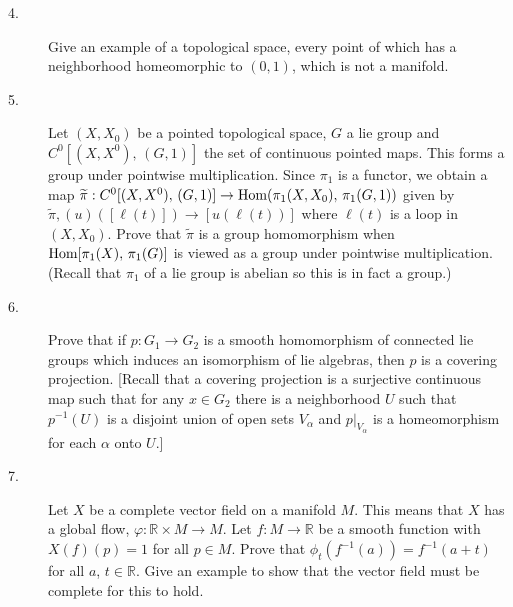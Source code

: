 \documentclass[12pt]{article}
\def\R{{\mathbb R}}
\begin{document}
\begin{large}
\begin{description}
\vspace{.15in}
\item[4.]
Give an example of a topological space, every point of which has a
neighborhood homeomorphic to $(0,1)$, which is not a manifold.

\vspace{.15in}
\item[5.]
Let $(X,X_0)$ be a pointed topological space, $G$ a lie group
and $C^0[(X,X^0),\,(G,1)]$ the set of continuous pointed maps.
This forms a group under pointwise multiplication.
Since $\pi_1$ is a functor, we obtain a map
$\widetilde\pi:C^0[(X,X^0),\,(G,1)]\to \hbox{Hom}(\pi_1(X,X_0),\,
\pi_1(G,1))$ given by $\widetilde\pi,(u)([\ell(t)])\to[u(\ell(t))]$
where $\ell(t)$ is a loop in $(X,X_0)$.
Prove that $\widetilde\pi$ is a group homomorphism when
$\hbox{Hom}[\pi_1(X),\, \pi_1(G)]$ is viewed as a group under pointwise
multiplication. (Recall that $\pi_1$ of a lie group is abelian so this is
in fact a group.)

\vspace{.15in}
\item[6.]
Prove that if $p:G_1\to G_2$ is a smooth homomorphism of connected
lie groups which induces an isomorphism of lie algebras,
then $p$ is a covering projection. [Recall that a covering projection is
a surjective continuous map such that for any $x\in G_2$ there is
a neighborhood $U$ such that $p^{-1}(U)$ is a disjoint union of
open sets $V_\alpha$ and $p\vert_{V_\alpha}$
is a homeomorphism for each $\alpha$ onto $U$.]

\vspace{.15in}
\item[7.]
Let $X$ be a complete vector field on a manifold $M$.
This means that $X$ has a global flow,
$\varphi :\R\times M\to M$.
Let $f:M\to \R$ be a smooth function with $X(f)(p)=1$ for all
$p\in M$. Prove that $\phi_t(f^{-1}(a))=f^{-1}(a+t)$ for all $a$, $t\in\R$.
Give an example to show that the vector field must be complete for this
to hold.




\end{description}
\end{large}
\end{document}
